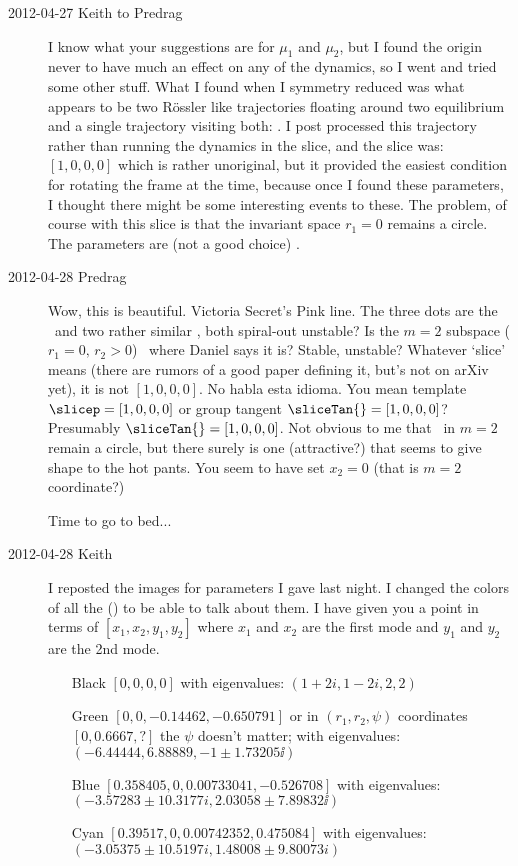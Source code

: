 \begin{description}
\item[2012-04-27 Keith to Predrag] I know what your suggestions are for
$\mu_1$ and $\mu_2$, but I found the origin never to have much an effect
on any of the dynamics, so I went and tried some other stuff.  What I
found when I symmetry reduced was what appears to be two R\"ossler like
trajectories floating around two equilibrium and a single trajectory
visiting both: .  I post processed this
trajectory rather than running the dynamics in the slice, and the slice
was: $[1, 0, 0, 0]$ which is rather unoriginal, but it provided the
easiest condition for rotating the frame at the time, because once I
found these parameters, I thought there might be some interesting events
to these.  The problem, of course with this slice is that the invariant
space $r_1 = 0$ remains a circle.
    The parameters are (not a good choice) .

\item[2012-04-28 Predrag] Wow, this is beautiful. Victoria Secret's Pink
line. The three dots are the \eqv\ and two rather similar \reqva, both
spiral-out unstable? Is the $m=2$ subspace ($r_1 = 0,\, r_2 > 0$) \reqv\
where Daniel says it is? Stable, unstable? Whatever `slice' means (there
are rumors of a good paper defining it, but's not on arXiv yet), it is
not $[1, 0, 0, 0]$. No habla esta idioma. You mean template $\slicep =
[1, 0, 0, 0]$ or group tangent $\sliceTan{} = [1, 0, 0, 0]$? Presumably
$\sliceTan{} = [1, 0, 0, 0]$. Not obvious to me that \reqv\ in $m=2$
remain a circle, but there surely is one (attractive?) that seems to give
shape to the hot pants. You seem to have set $x_2=0$ (that is $m=2$
coordinate?)

Time to go to bed...

\item[2012-04-28 Keith] I reposted the images for parameters I gave last
night.  I changed the colors of all the (\reqva) to be able
to talk about them.  I have given you a point in terms of $[x_1, x_2,
y_1, y_2]$ where $x_1$ and $x_2$ are the first mode and $y_1$ and $y_2$
are the 2nd mode.
\begin{itemize}
    \item[Black] $[0,0,0,0]$ with eigenvalues: $(1+2i,1-2i,2,2)$
    \item[Green] $[0,0,-0.14462,-0.650791]$ or in $(r_1, r_2, \psi)$
    coordinates $[0, 0.6667, ?]$ the $\psi$ doesn't matter; with eigenvalues:
    $(-6.44444,6.88889,-1 \pm 1.73205\ii)$
    \item[Blue] $[0.358405,0,0.00733041,-0.526708]$
    with eigenvalues: $(-3.57283 \pm 10.3177i,2.03058 \pm 7.89832\ii)$
    \item[Cyan] $[0.39517,0,0.00742352,0.475084]$
    with eigenvalues:  $(-3.05375 \pm 10.5197i,1.48008 \pm 9.80073i)$
\end{itemize}


\end{description}
